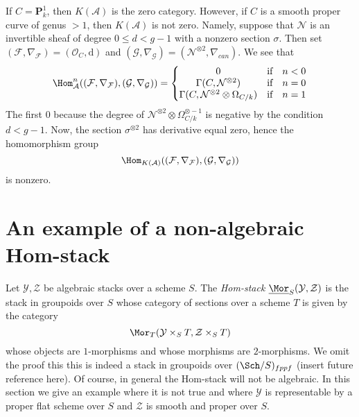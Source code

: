 \medskip\noindent
If $C = \mathbf{P}^1_k$, then $K(\mathcal{A})$ is the zero category.
However, if $C$ is a smooth proper curve of genus $> 1$, then
$K(\mathcal{A})$ is not zero. Namely, suppose that $\mathcal{N}$
is an invertible sheaf
of degree $0 \leq d < g - 1$ with a nonzero section $\sigma$.
Then set
$(\mathcal{F}, \nabla_\mathcal{F}) = (\mathcal{O}_C, \text{d})$
and
$(\mathcal{G}, \nabla_\mathcal{G}) = (\mathcal{N}^{\otimes 2}, \nabla_{can})$.
We see that
$$
\Hom_\mathcal{A}^n((\mathcal{F}, \nabla_\mathcal{F}),
(\mathcal{G}, \nabla_\mathcal{G})) =
\left\{
\begin{matrix}
0 & \text{if} & n < 0 \\
\Gamma(C, \mathcal{N}^{\otimes 2}) & \text{if} & n = 0 \\
\Gamma(C, \mathcal{N}^{\otimes 2} \otimes \Omega_{C/k}) & \text{if} & n = 1
\end{matrix}
\right.
$$
The first $0$ because the degree of
$\mathcal{N}^{\otimes 2} \otimes \Omega_{C/k}^{\otimes -1}$
is negative by the condition $d < g - 1$. Now, the section
$\sigma^{\otimes 2}$ has derivative equal zero, hence the homomorphism
group
$$
\Hom_{K(\mathcal{A})}((\mathcal{F}, \nabla_\mathcal{F}),
(\mathcal{G}, \nabla_\mathcal{G}))
$$
is nonzero.



\section{An example of a non-algebraic Hom-stack}
\label{section-non-algebraic-hom-stack}


\noindent
Let $\mathcal{Y}, \mathcal{Z}$ be algebraic stacks over a scheme $S$.
The {\it Hom-stack} $\underline{\Mor}_S(\mathcal{Y}, \mathcal{Z})$
is the stack in groupoids over $S$ whose category of sections over
a scheme $T$ is given by the category
$$
\Mor_T(\mathcal{Y} \times_S T, \mathcal{Z} \times_S T)
$$
whose objects are $1$-morphisms and whose morphisms are $2$-morphisms.
We omit the proof this this is indeed a stack in groupoids over
$(\Sch/S)_{fppf}$ (insert future reference here). Of course, in
general the Hom-stack will not be algebraic. In this section we
give an example where it is not true and where $\mathcal{Y}$ is
representable by a proper flat scheme over $S$ and $\mathcal{Z}$
is smooth and proper over $S$.

